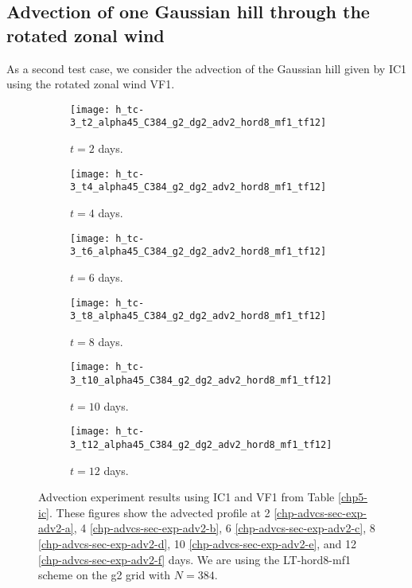\newpage
\subsection{Advection of one Gaussian hill through the rotated zonal wind}
As a second test case, we consider the advection of the Gaussian hill given by IC1 using 
the rotated zonal wind VF1.
\begin{figure}[!htb]
	\centering
	\begin{subfigure}{0.45\textwidth}
		\centering
		\texttt{[image: h\_tc-3\_t2\_alpha45\_C384\_g2\_dg2\_adv2\_hord8\_mf1\_tf12]}
		\caption{$t=2$ days.\label{chp-advcs-sec-exp-adv2-a}}
	\end{subfigure}
	\begin{subfigure}{0.45\textwidth}
		\centering
		\texttt{[image: h\_tc-3\_t4\_alpha45\_C384\_g2\_dg2\_adv2\_hord8\_mf1\_tf12]}
		\caption{$t=4$ days.\label{chp-advcs-sec-exp-adv2-b}}
	\end{subfigure}

	\begin{subfigure}{0.45\textwidth}
		\centering
		\texttt{[image: h\_tc-3\_t6\_alpha45\_C384\_g2\_dg2\_adv2\_hord8\_mf1\_tf12]}
		\caption{$t=6$ days.\label{chp-advcs-sec-exp-adv2-c}}
	\end{subfigure}	
	\begin{subfigure}{0.45\textwidth}
		\centering
		\texttt{[image: h\_tc-3\_t8\_alpha45\_C384\_g2\_dg2\_adv2\_hord8\_mf1\_tf12]}
		\caption{$t=8$ days.\label{chp-advcs-sec-exp-adv2-d}}
	\end{subfigure}

	\begin{subfigure}{0.45\textwidth}
		\centering
		\texttt{[image: h\_tc-3\_t10\_alpha45\_C384\_g2\_dg2\_adv2\_hord8\_mf1\_tf12]}
		\caption{$t=10$ days.\label{chp-advcs-sec-exp-adv2-e}}
	\end{subfigure}
	\begin{subfigure}{0.45\textwidth}
		\centering
		\texttt{[image: h\_tc-3\_t12\_alpha45\_C384\_g2\_dg2\_adv2\_hord8\_mf1\_tf12]}
		\caption{$t=12$ days.\label{chp-advcs-sec-exp-adv2-f}}
	\end{subfigure}
	\caption{Advection experiment  results using IC1 and VF1 from Table \ref{chp5-ic}.
		These figures show the advected profile at
		2 \eqref{chp-advcs-sec-exp-adv2-a}, 
		4  \eqref{chp-advcs-sec-exp-adv2-b},
		6  \eqref{chp-advcs-sec-exp-adv2-c},
		8  \eqref{chp-advcs-sec-exp-adv2-d},
		10  \eqref{chp-advcs-sec-exp-adv2-e},
		and 12  \eqref{chp-advcs-sec-exp-adv2-f} days.
		We are using the LT-hord8-mf1 scheme on the g2 grid with $N=384$. \label{chp-advcs-sec-exp-adv2}}
\end{figure}

